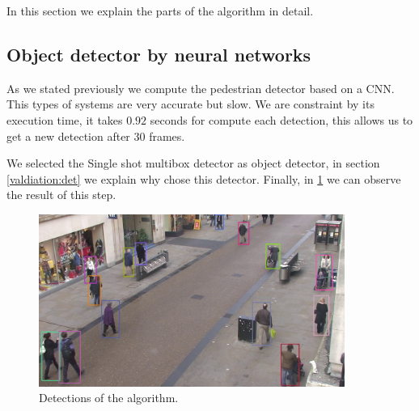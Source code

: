 In this section we explain the parts of the algorithm in detail.

\subsection{Object detector by neural networks}



As we stated previously we compute the pedestrian detector based on a CNN. This types of systems are very accurate but slow. We are constraint by its execution time, it takes $0.92$ seconds for compute each detection, this allows us to get a new detection after $30$ frames. 


We selected the Single shot multibox detector as object detector, in section \ref{valdiation:det} we explain why chose this detector. Finally, in \ref{objectDetector1} we can observe the result of this step.


\begin{figure}[H]
\centering         
\includegraphics[width=10cm]{intro/deteccions.jpg}
\caption{Detections of the algorithm.} \label{objectDetector1}
\end{figure}


